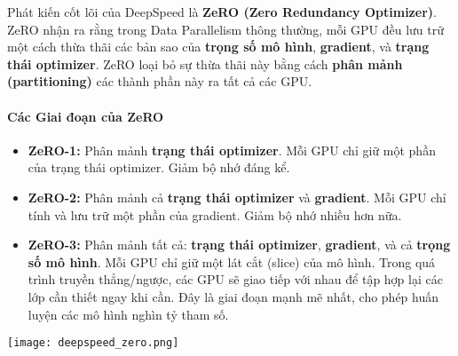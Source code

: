 \begin{tcolorbox}[
    title=ZeRO: Tối ưu hóa Bộ nhớ Cách mạng,
    colback=green!5!white, colframe=green!60!black, fonttitle=\bfseries
]
Phát kiến cốt lõi của DeepSpeed là \textbf{ZeRO (Zero Redundancy Optimizer)}. ZeRO nhận ra rằng trong Data Parallelism thông thường, mỗi GPU đều lưu trữ một cách thừa thãi các bản sao của \textbf{trọng số mô hình}, \textbf{gradient}, và \textbf{trạng thái optimizer}. ZeRO loại bỏ sự thừa thãi này bằng cách \textbf{phân mảnh (partitioning)} các thành phần này ra tất cả các GPU.
\end{tcolorbox}

\paragraph{Các Giai đoạn của ZeRO}
\begin{itemize}
    \item \textbf{ZeRO-1:} Phân mảnh \textbf{trạng thái optimizer}. Mỗi GPU chỉ giữ một phần của trạng thái optimizer. Giảm bộ nhớ đáng kể.
    \item \textbf{ZeRO-2:} Phân mảnh cả \textbf{trạng thái optimizer} và \textbf{gradient}. Mỗi GPU chỉ tính và lưu trữ một phần của gradient. Giảm bộ nhớ nhiều hơn nữa.
    \item \textbf{ZeRO-3:} Phân mảnh tất cả: \textbf{trạng thái optimizer}, \textbf{gradient}, và cả \textbf{trọng số mô hình}. Mỗi GPU chỉ giữ một lát cắt (slice) của mô hình. Trong quá trình truyền thẳng/ngược, các GPU sẽ giao tiếp với nhau để tập hợp lại các lớp cần thiết ngay khi cần. Đây là giai đoạn mạnh mẽ nhất, cho phép huấn luyện các mô hình nghìn tỷ tham số.
\end{itemize}

\begin{center}
    \texttt{[image: deepspeed\_zero.png]}
    \label{fig:deepspeed_zero}
\end{center}

